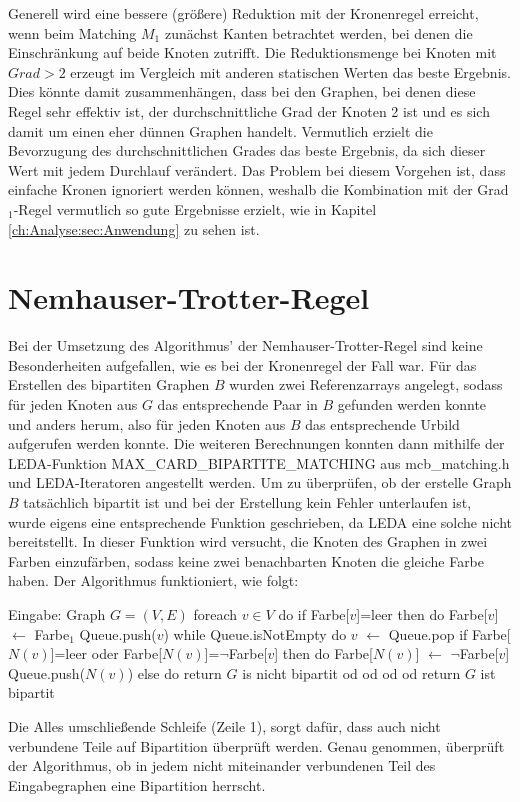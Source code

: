 Generell wird eine bessere (größere) Reduktion mit der Kronenregel erreicht, wenn beim Matching $M_{1}$ zunächst Kanten betrachtet werden, bei denen die Einschränkung auf beide Knoten zutrifft. Die Reduktionsmenge bei Knoten mit $Grad>2$ erzeugt im Vergleich mit anderen statischen Werten das beste Ergebnis. Dies könnte damit zusammenhängen, dass bei den Graphen, bei denen diese Regel sehr effektiv ist, der durchschnittliche Grad der Knoten 2 ist und es sich damit um einen eher dünnen Graphen handelt. Vermutlich erzielt die Bevorzugung des durchschnittlichen Grades das beste Ergebnis, da sich dieser Wert mit jedem Durchlauf verändert.
Das Problem bei diesem Vorgehen ist, dass einfache Kronen ignoriert werden können, weshalb die Kombination mit der Grad$_{1}$-Regel vermutlich so gute Ergebnisse erzielt, wie in Kapitel \ref{ch:Analyse:sec:Anwendung} zu sehen ist.





\section{Nemhauser-Trotter-Regel}
\label{ch:Implementierung:sec:Trott}

Bei der Umsetzung des Algorithmus' der Nemhauser-Trotter-Regel sind keine Besonderheiten aufgefallen, wie es bei der Kronenregel der Fall war. Für das Erstellen des bipartiten Graphen $B$ wurden zwei Referenzarrays angelegt, sodass für jeden Knoten aus $G$ das entsprechende Paar in $B$ gefunden werden konnte und anders herum, also für jeden Knoten aus $B$ das entsprechende Urbild aufgerufen werden konnte. Die weiteren Berechnungen konnten dann mithilfe der LEDA-Funktion MAX\_CARD\_BIPARTITE\_MATCHING aus mcb\_matching.h und LEDA-Iteratoren angestellt werden. Um zu überprüfen, ob der erstelle Graph $B$ tatsächlich bipartit ist und bei der Erstellung kein Fehler unterlaufen ist, wurde eigens eine entsprechende Funktion geschrieben, da LEDA eine solche nicht bereitstellt. In dieser Funktion wird versucht, die Knoten des Graphen in zwei Farben einzufärben, sodass keine zwei benachbarten Knoten die gleiche Farbe haben. Der Algorithmus funktioniert, wie folgt:
\begin{singlespace}
\begin{algorithm}[caption={Bipartit-Check}, label={alg4}]
Eingabe: Graph $G=(V,E)$ 
foreach $ v \in V$ do
  if Farbe[$v$]=leer then do
    Farbe[$v$] $\leftarrow$ Farbe$_{1}$    
    Queue.push($v$)
    while Queue.isNotEmpty do
      $v$ $\leftarrow$ Queue.pop
      if Farbe[$N(v)$]=leer oder Farbe[$N(v)$]=$\neg$Farbe[$v$] then do
        Farbe[$N(v)$] $\leftarrow$ $\neg$Farbe[$v$]
        Queue.push($N(v)$)
      else do
        return $G$ is nicht bipartit
      od 
    od
  od  
od
return $G$ ist bipartit
\end{algorithm}
\end{singlespace}
Die Alles umschließende Schleife (Zeile 1), sorgt dafür, dass auch nicht verbundene Teile auf Bipartition überprüft werden. Genau genommen, überprüft der Algorithmus, ob in jedem nicht miteinander verbundenen Teil des Eingabegraphen eine Bipartition herrscht.

